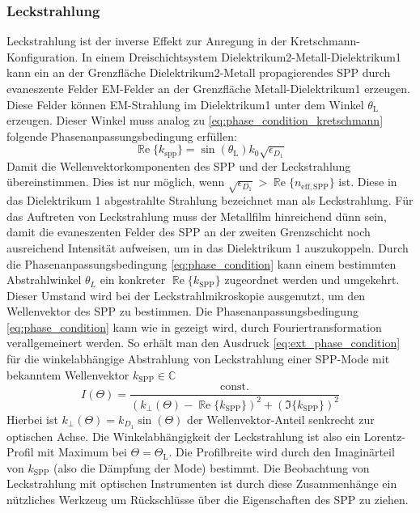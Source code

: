 \documentclass[titlepage]{article}
\renewcommand{\Re}{\operatorname{\mathbb{R}e}}
\begin{document}
		\subsubsection{Leckstrahlung}
		\label{sec:leakage_radiation}
			Leckstrahlung ist der inverse Effekt zur Anregung in der Kretschmann-Konfiguration. In einem Dreischichtsystem Dielektrikum2-Metall-Dielektrikum1 kann ein an der Grenzfläche Dielektrikum2-Metall propagierendes SPP durch evaneszente Felder EM-Felder an der Grenzfläche Metall-Dielektrikum1 erzeugen. Diese Felder können EM-Strahlung im Dielektrikum1 unter dem Winkel $\theta_\mathrm{L}$ erzeugen. Dieser Winkel muss analog zu \eqref{eq:phase_condition_kretschmann} folgende Phasenanpassungsbedingung erfüllen:
			\begin{equation}
				\label{eq:phase_condition}
				\boxed{\Re\{k_{\mathrm{spp}}\}=\sin(\theta_\mathrm{L}) k_0 \sqrt{\epsilon_{D_1}}}
			\end{equation}
			Damit die Wellenvektorkomponenten des SPP und der Leckstrahlung übereinstimmen.
	 		Dies ist nur möglich, wenn {$\sqrt{\epsilon_{D_1}} > \Re\{n_\mathrm{eff, SPP}\}$} ist. Diese in das Dielektrikum 1 abgestrahlte Strahlung bezeichnet man als Leckstrahlung. Für das Auftreten von Leckstrahlung muss der Metallfilm hinreichend dünn sein, damit die evaneszenten Felder des  SPP an der zweiten Grenzschicht noch ausreichend Intensität aufweisen, um in das Dielektrikum 1 auszukoppeln. Durch die Phasenanpassungsbedingung \eqref{eq:phase_condition} kann einem bestimmten Abstrahlwinkel $\theta_L$ ein konkreter $\Re\{k_{\mathrm{SPP}}\}$ zugeordnet werden und umgekehrt. Dieser Umstand wird bei der Leckstrahlmikroskopie ausgenutzt, um den Wellenvektor des SPP zu bestimmen.
			Die Phasenanpassungsbedingung \eqref{eq:phase_condition} kann  wie in \cite{Burke.1986} gezeigt wird, durch Fouriertransformation verallgemeinert werden. So erhält man den Ausdruck \eqref{eq:ext_phase_condition} für die winkelabhängige Abstrahlung von Leckstrahlung einer SPP-Mode mit bekanntem Wellenvektor $k_{\mathrm{SPP}} \in \mathbb{C}$
			\begin{equation}
		 		\label{eq:ext_phase_condition}
		 		I(\Theta) = \dfrac{\text{const.}}{\left(k_{\perp}(\Theta) - \Re\{k_{\mathrm{SPP}}\}\right)^2 + (\Im\{k_{\mathrm{SPP}}\})^2}
	 		\end{equation}
 			Hierbei ist $k_{\perp}(\Theta) = k_{D_1}\sin(\Theta)$ der Wellenvektor-Anteil senkrecht zur optischen Achse. Die Winkelabhängigkeit der Leckstrahlung ist also ein Lorentz-Profil mit Maximum bei $\Theta = \Theta_\mathrm{L}$. Die Profilbreite wird durch den Imaginärteil von $k_{\mathrm{SPP}}$ (also die Dämpfung der Mode) bestimmt. Die Beobachtung von Leckstrahlung mit optischen Instrumenten ist durch diese Zusammenhänge ein nützliches Werkzeug um Rückschlüsse über die Eigenschaften des SPP zu ziehen.
\end{document}
